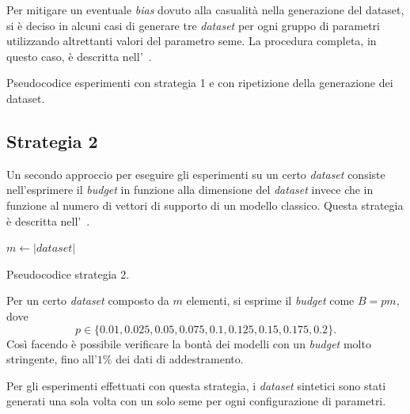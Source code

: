 Per mitigare un eventuale \emph{bias} dovuto alla casualità nella generazione del dataset, si è deciso in alcuni casi di generare tre \emph{dataset} per ogni gruppo di parametri utilizzando altrettanti valori del parametro seme.
La procedura completa, in questo caso, è descritta nell'~.
\begin{algorithm}
    \SetAlgoLined
\caption{Pseudocodice esperimenti con strategia 1 e con ripetizione della generazione dei dataset.}
\label{alg:esperimenti_2}
\end{algorithm}

\subsection{Strategia 2}
Un secondo approccio per eseguire gli esperimenti su un certo \emph{dataset} consiste nell'esprimere il \emph{budget} in funzione alla dimensione del \emph{dataset} invece che in funzione al numero di vettori di supporto di un modello classico.
Questa strategia è descritta nell'~.
\begin{algorithm}
    \SetAlgoLined
    $m \gets |\textit{dataset}|$\;
\caption{Pseudocodice strategia 2.}
\label{alg:esperimenti_3}
\end{algorithm}
Per un certo \emph{dataset} composto da $m$ elementi, si esprime il \emph{budget} come $B=pm$, dove
\begin{equation*}
    p\in\{0.01, 0.025, 0.05, 0.075, 0.1, 0.125, 0.15, 0.175, 0.2\}.
\end{equation*}
Così facendo è possibile verificare la bontà dei modelli con un \emph{budget} molto stringente, fino all'$1\%$ dei dati di addestramento.

Per gli esperimenti effettuati con questa strategia, i \emph{dataset} sintetici sono stati generati una sola volta con un solo seme per ogni configurazione di parametri.

